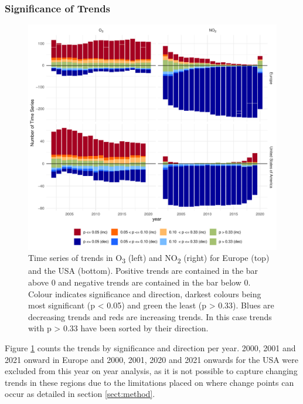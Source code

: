 \documentclass[journal abbreviation, manuscript]{copernicus}
\begin{document}






\clearpage
\subsubsection{Significance of Trends} \label{sect:significance_of_trends}

\begin{figure}[htbp]
\includegraphics[width=12cm]{figures/f5_significance_bars.pdf}
\caption{Time series of trends in O\textsubscript{3} (left) and NO\textsubscript{2} (right) for Europe (top) and the USA (bottom). Positive trends are contained in the bar above 0 and negative trends are contained in the bar below 0. Colour indicates significance and direction, darkest colours being most significant (p < 0.05) and green the least (p > 0.33). Blues are decreasing trends and reds are increasing trends. In this case trends with p > 0.33 have been sorted by their direction.}
\label{fig:p_bar_year}
\end{figure}

Figure \ref{fig:p_bar_year} counts the trends by significance and direction per year. 2000, 2001 and 2021 onward in Europe and 2000, 2001, 2020 and 2021 onwards for the USA were excluded from this year on year analysis, as it is not possible to capture changing trends in these regions due to the limitations placed on where change points can occur as detailed in section \ref{sect:method}.
\end{document}
